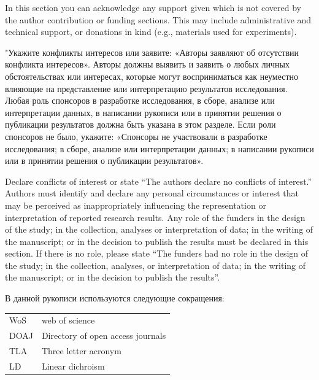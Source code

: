 \documentclass[i-edu.uz,journal,article,submit,pdftex,moreauthors]{Definitions/i-edu.uz}
\begin{document}
\begin{sloppypar}
\acknowledgments

{In this section you can acknowledge any support given which is not covered by the author contribution or funding sections. This may include administrative and technical support, or donations in kind (e.g., materials used for experiments).}

\conflictsofinterestr

{"Укажите конфликты интересов или заявите: «Авторы заявляют об отсутствии конфликта интересов». Авторы должны выявить и заявить о любых личных обстоятельствах или интересах, которые могут восприниматься как неуместно влияющие на представление или интерпретацию результатов исследования. Любая роль спонсоров в разработке исследования, в сборе, анализе или интерпретации данных, в написании рукописи или в принятии решения о публикации результатов должна быть указана в этом разделе. Если роли спонсоров не было, укажите: «Спонсоры не участвовали в разработке исследования; в сборе, анализе или интерпретации данных; в написании рукописи или в принятии решения о публикации результатов».} 

\conflictsofinterest

{Declare conflicts of interest or state ``The authors declare no conflicts of interest.'' Authors must identify and declare any personal circumstances or interest that may be perceived as inappropriately influencing the representation or interpretation of reported research results. Any role of the funders in the design of the study; in the collection, analyses or interpretation of data; in the writing of the manuscript; or in the decision to publish the results must be declared in this section. If there is no role, please state ``The funders had no role in the design of the study; in the collection, analyses, or interpretation of data; in the writing of the manuscript; or in the decision to publish the results''.}

{В данной рукописи используются следующие сокращения:\\

\noindent 
\begin{tabular}{@{}ll}
WoS  &  web of science\\
DOAJ & Directory of open access journals\\
TLA & Three letter acronym\\
LD & Linear dichroism
\end{tabular}
}


\end{sloppypar}
\end{document}
